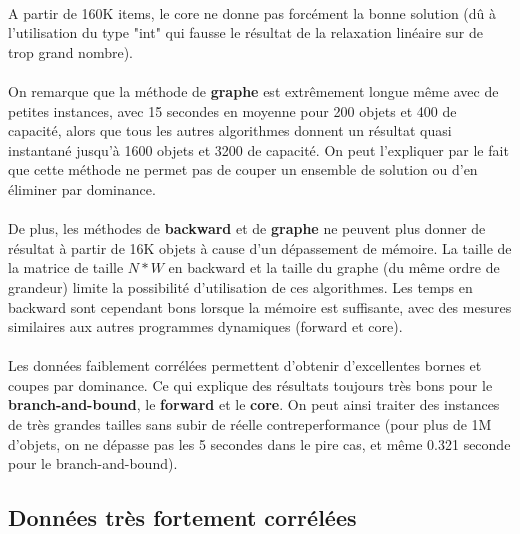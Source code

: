 \documentclass[12pt]{article}
\begin{document}
\paragraph{}A partir de 160K items, le core ne donne pas forcément la bonne solution (dû à l'utilisation du type "int" qui fausse le résultat de la relaxation linéaire sur de trop grand nombre).

\paragraph{}On remarque que la méthode de \textbf{graphe} est extrêmement longue même avec de petites instances, avec 15 secondes en moyenne pour 200 objets et 400 de capacité, alors que tous les autres algorithmes donnent un résultat quasi instantané jusqu'à 1600 objets et 3200 de capacité. On peut l'expliquer par le fait que cette méthode ne permet pas de couper un ensemble de solution ou d'en éliminer par dominance.

\paragraph{}De plus, les méthodes de \textbf{backward} et de \textbf{graphe} ne peuvent plus donner de résultat à partir de 16K objets à cause d'un dépassement de mémoire. La taille de la matrice de taille $N*W$ en backward et la taille du graphe (du même ordre de grandeur) limite la possibilité d'utilisation de ces algorithmes. Les temps en backward sont cependant bons lorsque la mémoire est suffisante, avec des mesures similaires aux autres programmes dynamiques (forward et core).

\paragraph{}Les données faiblement corrélées permettent d'obtenir d'excellentes bornes et coupes par dominance. Ce qui explique des résultats toujours très bons pour le \textbf{branch-and-bound}, le \textbf{forward} et le \textbf{core}. On peut ainsi traiter des instances de très grandes tailles sans subir de réelle contreperformance (pour plus de 1M d'objets, on ne dépasse pas les 5 secondes dans le pire cas, et même 0.321 seconde pour le branch-and-bound).


\subsection{Données très fortement corrélées}
\end{document}
